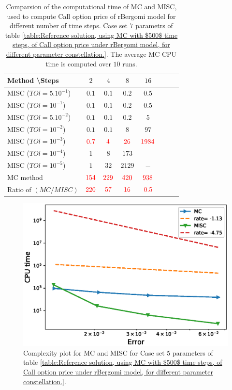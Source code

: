\documentclass[11pt]{article}
\begin{document}
\begin{table}[h!]
	\centering
	\begin{tabular}{l*{6}{c}r}
		Method \textbackslash  Steps            & $2$ & $4$ & $8$ & $16$ &   \\
		\hline
		MISC ($TOl=5.10^{-1}$)  & $0.1$ & $0.1$ & $0.2$ & $0.5$  \\
		MISC ($TOl=10^{-1}$)  & $0.1$ & $0.1$ & $0.2$ & $0.5$ \\
		MISC ($TOl=5.10^{-2}$)  & $0.1$ & $0.1$ & $0.2$ & $5$  \\
		MISC ($TOl=10^{-2}$)  & $0.1$ & $0.1$ & $8$ & $97$ \\
		MISC ($TOl=10^{-3}$)  & $\red{0.7}$ & $\red{4}$ & $\red{26}$ & $\red{1984}$ \\
		MISC ($TOl=10^{-4}$)  & $1$ & $8$ & $173$ & $-$\\
		MISC ($TOl=10^{-5}$)  & $1$ & $32$ & $2129$ & $-$
		\\
		\hline
		MC method   & $ \red{154}
		
		$  & $  \red{229}$  & $  \red{420}$ & $ \red{938}
		$  \\	
		\hline
		Ratio of $\left(MC/MISC \right)$ & $ \red{   220}
		
		$  & $  \red{
		 57
		}$  & $  \red{    16
		}$ & $ \red{ 0.5}
		$  \\	
				
		\hline
	\end{tabular}
	\caption{Comparsion of the computational time of  MC and MISC, used to compute Call option price of rBergomi model for different number of time steps. Case set $7$ parametrs of table \ref{table:Reference solution, using MC with $500$ time steps, of Call option price under rBergomi model, for different parameter constellation.}. The average  MC CPU time is computed over $10$ runs. }
	\label{Comparsion of the computational time of  MC and MISC, used to compute Call option price of rBergomi model for different number of time steps. Case set7}
\end{table}
	\begin{figure}[h!]
	\centering
	\includegraphics[width=0.7\linewidth]{./figures/rBergomi_Complexity_rates/set7/error_vs_time_set7}
	
	\caption{Complexity plot for   MC and MISC for Case set $5$ parameters of table \ref{table:Reference solution, using MC with $500$ time steps, of Call option price under rBergomi model, for different parameter constellation.}.}
	\label{fig:Complexity plot for MC and MISC for Case set $7$ parameters}
\end{figure}
\FloatBarrier
\end{document}
